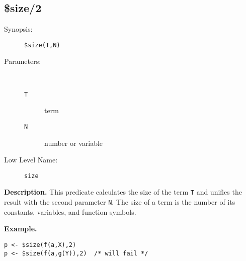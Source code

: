 %
%
%
\subsection{\$size/2}

\begin{description}
\item[Synopsis:]
	{\tt \$size(T,N)}
\item[Parameters:]\ \\[-0.5cm]
	\begin{description}
	\item[{\tt T}] term
	\item[{\tt N}] number or variable
	\end{description}
\item[Low Level Name:]
	{\tt size}
\end{description}

\vspace*{0.5cm}
\noindent
{\bf Description.}
This predicate calculates the size of the term {\tt T} and
unifies the result with the second parameter {\tt N}.
The size of a term is the number of its constants, variables, and
function symbols.

\vspace*{0.5cm}
\noindent
{\bf Example.}
\begin{verbatim}
p <- $size(f(a,X),2)
p <- $size(f(a,g(Y)),2)  /* will fail */
\end{verbatim}


